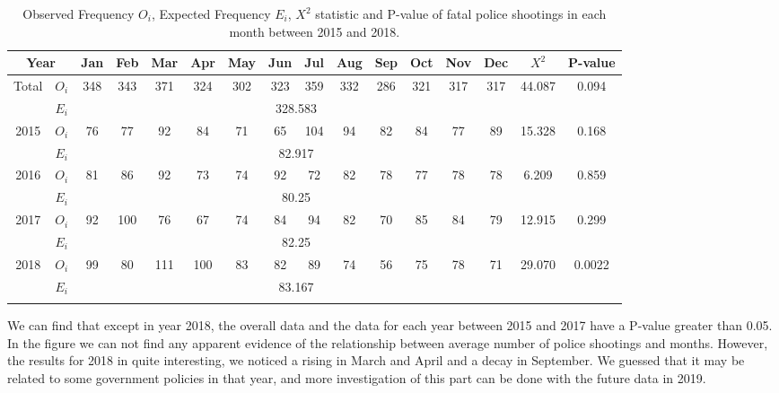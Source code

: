 \documentclass[conf]{new-aiaa}
\begin{document}
\begin{table}[!htbp]
\centering
\begin{tabular}{cc|cccccccccccc|cc}
\toprule 
\toprule
\multicolumn{2}{c|}{Year} & Jan & Feb & Mar & Apr & May & Jun & Jul & Aug & Sep & Oct & Nov & Dec & $X^2$ & P-value\\
\hline
\multirow{2}{*}{Total} & $O_i$ & 348 & 343 & 371 & 324 & 302 & 323 & 359 & 332 & 286 & 321 & 317 & 317 & \multirow{2}{*}{44.087} & \multirow{2}{*}{0.094}\\
& $E_i$ &&&&&&\multicolumn{2}{c}{328.583}&&&&&& \\
\hline
\multirow{2}{*}{2015} & $O_i$ & 76 & 77 & 92 & 84 & 71 & 65 & 104 & 94 & 82 & 84 & 77 & 89 & \multirow{2}{*}{15.328} & \multirow{2}{*}{0.168}\\
& $E_i$ &&&&&&\multicolumn{2}{c}{82.917}&&&&&& \\
\hline
\multirow{2}{*}{2016} & $O_i$ & 81 & 86 & 92 & 73 & 74 & 92 & 72 & 82 & 78 & 77 & 78 & 78 & \multirow{2}{*}{6.209} & \multirow{2}{*}{0.859}\\
& $E_i$ &&&&&&\multicolumn{2}{c}{80.25}&&&&&& \\
\hline
\multirow{2}{*}{2017} & $O_i$ & 92 & 100 & 76 & 67 & 74 & 84 & 94 & 82 & 70 & 85 & 84 & 79 & \multirow{2}{*}{12.915} & \multirow{2}{*}{0.299}\\
& $E_i$ &&&&&&\multicolumn{2}{c}{82.25}&&&&&& \\
\hline
\multirow{2}{*}{2018} & $O_i$ & 99 & 80 & 111 & 100 & 83 & 82 & 89 & 74 & 56 & 75 & 78 & 71 & \multirow{2}{*}{29.070} & \multirow{2}{*}{0.0022}\\
& $E_i$ &&&&&&\multicolumn{2}{c}{83.167}&&&&&& \\
\bottomrule 
\bottomrule\noalign{\bigskip}
\end{tabular}
\caption{Observed Frequency $O_i$, Expected Frequency $E_i$, $X^2$ statistic and P-value of fatal police shootings in each month between 2015 and 2018.}
\label{tab:q4-month}
\end{table}

We can find that except in year 2018, the overall data and the data for each year between 2015 and 2017 have a P-value greater than 0.05. In the figure we can not find any apparent evidence of the relationship between  average number of police shootings and months. However, the results for 2018 in quite interesting, we noticed a rising in March and April and a decay in September. We guessed that it may be related to some government policies in that year, and more investigation of this part can be done with the future data in 2019. \medskip
\end{document}
